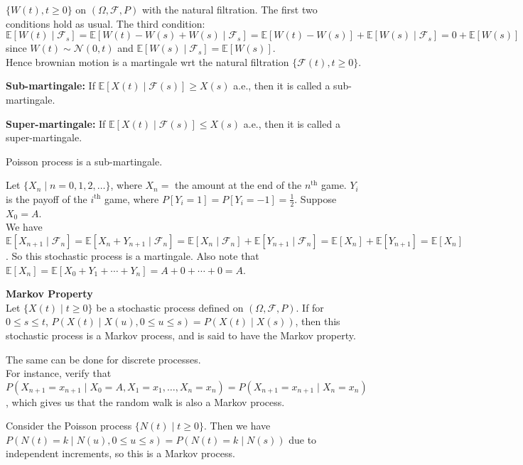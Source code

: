 \documentclass[a4paper]{article}
\newcommand{\nl}{\vspace{0.2cm}\\}
\newcommand{\F}{\mathcal{F}}
\newcommand{\N}{\mathcal{N}}
\newcommand{\E}{\mathbb{E}}
\begin{document}
\begin{eg}
    $\{W(t), t \ge 0\}$ on $(\Omega, \F, P)$ with the natural filtration. The first two conditions hold as usual. The third condition:\nl
    $\E[W(t) \mid \F_s] = \E[W(t) - W(s) + W(s) \mid \F_s] = \E[W(t) - W(s)] + \E[W(s) \mid \F_s] = 0 + \E[W(s)]$ since $W(t) \sim \N(0, t)$ and $\E[W(s) \mid \F_s] = \E[W(s)]$.\nl
    Hence brownian motion is a martingale wrt the natural filtration $\{\F(t), t \ge 0\}$.
\end{eg}

\begin{defn}
    \textbf{Sub-martingale:} If $\E[X(t) \mid \F(s)] \ge X(s)$ a.e., then it is called a sub-martingale.
\end{defn}

\begin{defn}
    \textbf{Super-martingale:} If $\E[X(t) \mid \F(s)] \le X(s)$ a.e., then it is called a super-martingale.
\end{defn}

Poisson process is a sub-martingale.\nl

\begin{eg}
    Let $\{X_n \mid n = 0, 1, 2, \ldots\}$, where $X_n =$ the amount at the end of the $n^\mathrm{th}$ game. $Y_i$ is the payoff of the $i^\mathrm{th}$ game, where $P[Y_i = 1] = P[Y_i = -1] =
    \frac12$. Suppose $X_0 = A$.\nl
    We have $\E[X_{n+1} \mid \F_n] = \E[X_n + Y_{n+1} \mid \F_n] = \E[X_n \mid \F_n] + \E[Y_{n+1} \mid \F_n] = \E[X_n] + \E[Y_{n+1}] = \E[X_n]$. So this stochastic process is a martingale. Also note that $\E[X_n] = \E[X_0 + Y_1 + \cdots +
    Y_n] = A + 0 + \cdots + 0 = A$.
\end{eg}

\begin{defn}
    \textbf{Markov Property}\nl
    Let $\{X(t) \mid t \ge 0\}$ be a stochastic process defined on $(\Omega, \F, P)$. If for $0 \le s \le t$, $P(X(t) \mid X(u), 0 \le u \le s) = P(X(t) \mid X(s))$, then this stochastic process
    is a Markov process, and is said to have the Markov property.
\end{defn}

The same can be done for discrete processes.\nl
For instance, verify that $P(X_{n+1} = x_{n+1} \mid X_0 = A, X_1 = x_1, \ldots, X_n = x_n) = P(X_{n+1} = x_{n+1} \mid X_n = x_n)$, which gives us that the random walk is also a Markov process.\nl

\begin{eg}
    Consider the Poisson process $\{N(t) \mid t \ge 0\}$. Then we have $P(N(t) = k \mid N(u), 0 \le u \le s) = P(N(t) = k \mid N(s))$ due to independent increments, so this is a Markov process.
\end{eg}
\end{document}

